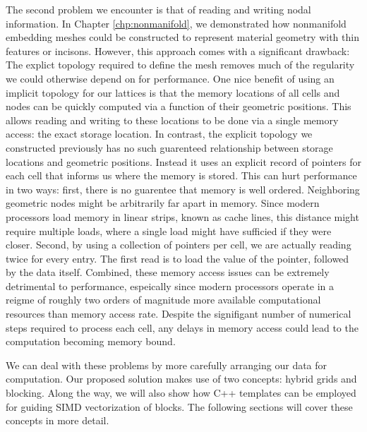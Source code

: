 The second problem we encounter is that of reading and writing nodal
information. In Chapter \ref{chp:nonmanifold}, we demonstrated how
nonmanifold embedding meshes could be constructed to represent
material geometry with thin features or incisons. However, this
approach comes with a significant drawback: The explict topology
required to define the mesh removes much of the regularity we could
otherwise depend on for performance. One nice benefit of using an
implicit topology for our lattices is that the memory locations of all
cells and nodes can be quickly computed via a function of their
geometric positions. This allows reading and writing to these
locations to be done via a single memory access: the exact storage
location. In contrast, the explicit topology we constructed
previously has no such guarenteed relationship between storage
locations and geometric positions. Instead it uses an explicit record
of pointers for each cell that informs us where the memory is
stored. This can hurt performance in two ways: first, there is no
guarentee that memory is well ordered. Neighboring geometric nodes
might be arbitrarily far apart in memory. Since modern processors load memory in
linear strips, known as cache lines, this distance might require
multiple loads, where a single load might have sufficied if they were
closer. Second, by using a collection of pointers per cell, we are
actually reading twice for every entry. The first read is to load the
value of the pointer, followed by the data itself. Combined, these
memory access issues can be extremely detrimental to performance,
espeically since modern processors operate in a reigme of roughly two
orders of magnitude more available computational resources than memory
access rate. Despite the signifigant number of numerical steps
required to process each cell, any delays in memory access could lead
to the computation becoming memory bound.

We can deal with these problems by more carefully arranging our data
for computation. Our proposed solution makes use of two concepts:
hybrid grids and blocking. Along the way, we will also show how C++
templates can be employed for guiding SIMD vectorization of
blocks. The following sections will cover these concepts in more detail.

